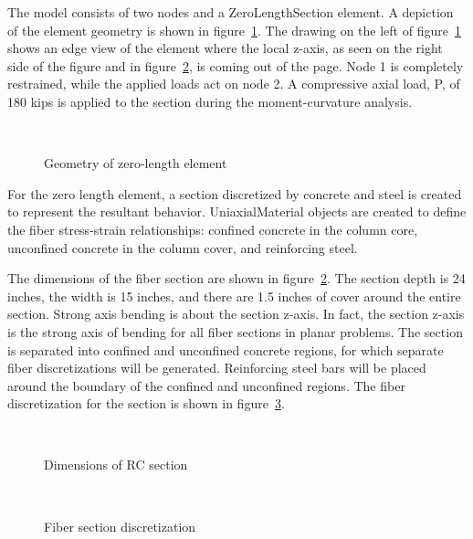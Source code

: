 \documentclass[12pt]{article}
\begin{document}
The model consists of two nodes and a ZeroLengthSection element.
A depiction of the element geometry is shown in figure~\ref{zerolength}.
The drawing on the left of figure~\ref{zerolength} shows an edge
view of the element where the local z-axis, as seen on the right
side of the figure and in
figure~\ref{rcsection0}, is coming out of the page. Node 1 is
completely restrained, while the applied loads act on node 2.
A compressive axial load, P,  of 180 kips is applied to the section
during the moment-curvature analysis.

\begin{figure}[h]
\begin{center}
\leavevmode
\hbox{%
\epsfxsize=4.0in
}
\end{center}
\caption{Geometry of zero-length element}
\label{zerolength}
\end{figure}


For the zero length element, a section discretized by concrete
and steel is created to represent the resultant behavior.
UniaxialMaterial objects are created to define the fiber
stress-strain relationships: confined concrete in the column core,
unconfined concrete in the column cover, and reinforcing steel.

The dimensions of the fiber section are shown in
figure~\ref{rcsection0}. The section depth is
24 inches, the width is 15 inches, and there are 1.5 inches of cover
around the entire section. Strong axis bending is about the section
z-axis. In fact, the section z-axis is the strong axis of bending
for all fiber sections in planar problems. The section is separated
into confined and unconfined concrete regions, for which separate
fiber discretizations will be 
generated. Reinforcing steel bars will be placed around the boundary
of the confined and unconfined regions.
The fiber discretization for the section is shown in
figure~\ref{rcsection4}.


\begin{figure}[h]
\begin{center}
\leavevmode
\hbox{%
\epsfxsize=4.0in
}
\end{center}
\caption{Dimensions of RC section}
\label{rcsection0}
\end{figure}


\begin{figure}[h]
\begin{center}
\leavevmode
\hbox{%
\epsfxsize=4.0in
}
\end{center}
\caption{Fiber section discretization}
\label{rcsection4}
\end{figure}
\end{document}
